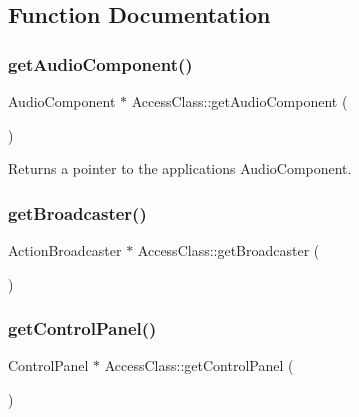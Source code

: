 \subsection{Function Documentation}
\mbox{\label{namespace_access_class_a6008b5597fd52fabd69ff28725717287}} 
\subsubsection{\texorpdfstring{get\+Audio\+Component()}{getAudioComponent()}}
{\footnotesize\ttfamily Audio\+Component $\ast$ Access\+Class\+::get\+Audio\+Component (\begin{DoxyParamCaption}{ }\end{DoxyParamCaption})}

Returns a pointer to the application\textquotesingle{}s Audio\+Component. \mbox{\label{namespace_access_class_abbdfc97a1cc576d5808d6c9958fdd84f}} 
\subsubsection{\texorpdfstring{get\+Broadcaster()}{getBroadcaster()}}
{\footnotesize\ttfamily Action\+Broadcaster $\ast$ Access\+Class\+::get\+Broadcaster (\begin{DoxyParamCaption}{ }\end{DoxyParamCaption})}

\mbox{\label{namespace_access_class_a85b3fce72926c6c93cede477ed7f0dc1}} 
\subsubsection{\texorpdfstring{get\+Control\+Panel()}{getControlPanel()}}
{\footnotesize\ttfamily Control\+Panel $\ast$ Access\+Class\+::get\+Control\+Panel (\begin{DoxyParamCaption}{ }\end{DoxyParamCaption})}

